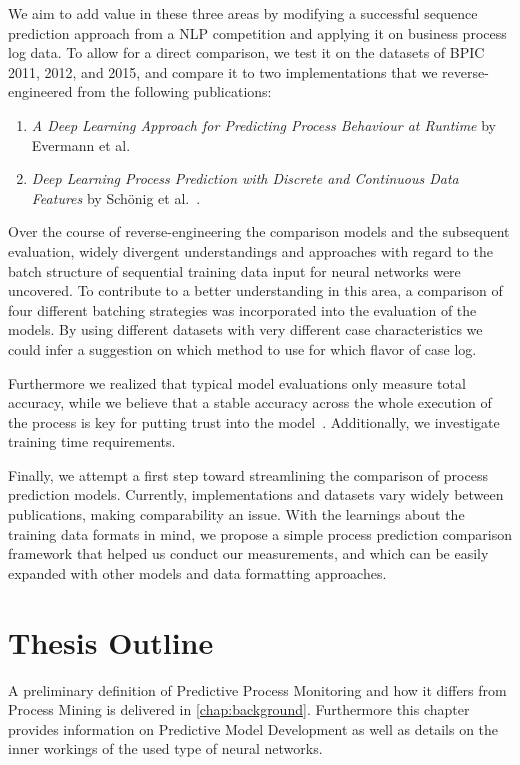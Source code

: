 We aim to add value in these three areas by modifying a successful sequence prediction approach from a NLP competition and applying it on business process log data. To allow for a direct comparison, we test it on the datasets of BPIC 2011, 2012, and 2015, and compare it to two implementations that we reverse-engineered from the following publications:

\begin{enumerate}
    \item \textit{A Deep Learning Approach for Predicting Process Behaviour at Runtime} by Evermann et al.~\cite{evermann2016}
    \item\textit{Deep Learning Process Prediction with Discrete and Continuous Data Features} by Schönig et al.~\cite{schoenig2018}.
\end{enumerate}

Over the course of reverse-engineering the comparison models and the subsequent evaluation, widely divergent understandings and approaches with regard to the batch structure of sequential training data input for neural networks were uncovered. To contribute to a better understanding in this area, a comparison of four different batching strategies was incorporated into the evaluation of the models. By using different datasets with very different case characteristics we could infer a suggestion on which method to use for which flavor of case log.

Furthermore we realized that typical model evaluations only measure total accuracy, while we believe that a stable accuracy across the whole execution of the process is key for putting trust into the model~\cite{francescomarino2015, boehmer2018probability}. Additionally, we investigate training time requirements.

Finally, we attempt a first step toward streamlining the comparison of process prediction models. Currently, implementations and datasets vary widely between publications, making comparability an issue. With the learnings about the training data formats in mind, we propose a simple process prediction comparison framework that helped us conduct our measurements, and which can be easily expanded with other models and data formatting approaches.

\section{Thesis Outline}\label{sec:intro:outline}
A preliminary definition of Predictive Process Monitoring and how it differs from Process Mining is delivered in \autoref{chap:background}. Furthermore this chapter provides information on Predictive Model Development as well as details on the inner workings of the used type of neural networks.

